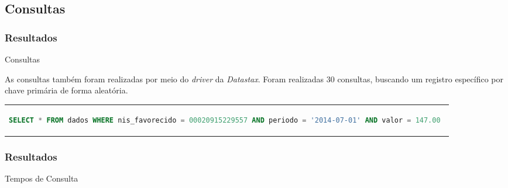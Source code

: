 \documentclass[brazil]{beamer}
\begin{document}
\subsection{Consultas}
\begin{frame}[fragile]
	\frametitle{Resultados}
	\begin{block}{Consultas}
	
	As consultas também foram realizadas por meio do \emph{driver} da \emph{Datastax}. Foram realizadas 30 consultas, buscando um registro específico por chave primária de forma aleatória.
	
	\begin{tabular}{c}
		\begin{lstlisting}[caption={Código CQL para consulta},language=SQL]
		SELECT * FROM dados WHERE nis_favorecido = 00020915229557 AND periodo = '2014-07-01' AND valor = 147.00 
		\end{lstlisting}
	\end{tabular}
	\end{block}
\end{frame}

\begin{frame}
	\frametitle{Resultados}
	
	\begin{block}{Tempos de Consulta}
	\begin{table}
		\centering
		\caption{Tempos de Consulta}
	\end{table}	
	
	\begin{table}
		\centering
		\caption{Comparativo}
	\end{table}
	\end{block}	
\end{frame}
\end{document}
